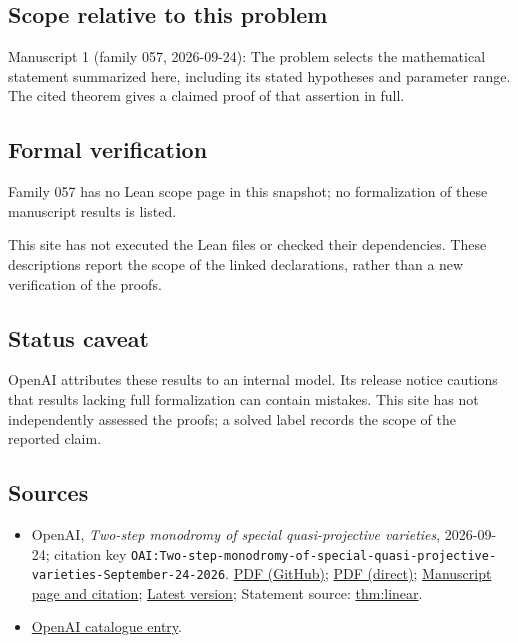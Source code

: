 \documentclass[11pt]{article}
\begin{document}
\subsection{Scope relative to this problem}
Manuscript 1 (family 057, 2026-09-24): The problem selects the mathematical statement summarized here, including its stated hypotheses and parameter range. The cited theorem gives a claimed proof of that assertion in full.

\subsection{Formal verification}
Family 057 has no Lean scope page in this snapshot; no formalization of these manuscript results is listed.

This site has not executed the Lean files or checked their dependencies. These descriptions report the scope of the linked declarations, rather than a new verification of the proofs.

\subsection{Status caveat}
OpenAI attributes these results to an internal model. Its release notice cautions that results lacking full formalization can contain mistakes. This site has not independently assessed the proofs; a solved label records the scope of the reported claim.

\subsection{Sources}
\begin{itemize}
\item OpenAI, \emph{Two-step monodromy of special quasi-projective varieties}, 2026-09-24; citation key \texttt{OAI:Two-step-monodromy-of-special-quasi-projective-varieties-September-24-2026}. \href{https://github.com/openai/math/blob/adc7f1241b42e322a6451854ab7e4b4c146bf78a/preprints/Two-step-monodromy-of-special-quasi-projective-varieties-September-24-2026/paper.pdf}{PDF (GitHub)}; \href{https://github.com/openai/math/raw/adc7f1241b42e322a6451854ab7e4b4c146bf78a/preprints/Two-step-monodromy-of-special-quasi-projective-varieties-September-24-2026/paper.pdf}{PDF (direct)}; \href{https://github.com/openai/math/blob/adc7f1241b42e322a6451854ab7e4b4c146bf78a/preprints/Two-step-monodromy-of-special-quasi-projective-varieties-September-24-2026/README.md}{Manuscript page and citation}; \href{https://github.com/openai/math/blob/main/preprints/Two-step-monodromy-of-special-quasi-projective-varieties-September-24-2026/paper.pdf}{Latest version}; Statement source: \href{https://github.com/openai/math/blob/adc7f1241b42e322a6451854ab7e4b4c146bf78a/preprints/Two-step-monodromy-of-special-quasi-projective-varieties-September-24-2026/build/sections/introduction.tex\#L40}{thm:linear}.
\item \href{https://github.com/openai/math/blob/adc7f1241b42e322a6451854ab7e4b4c146bf78a/CONTENTS.md}{OpenAI catalogue entry}.
\end{itemize}
\end{document}
